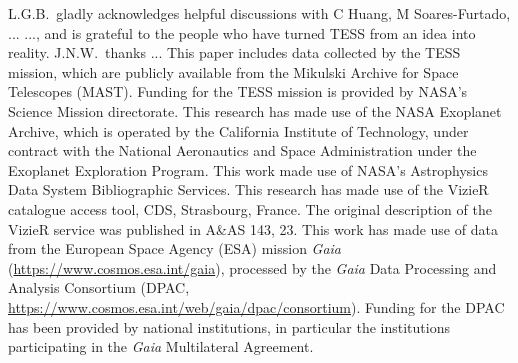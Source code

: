 \documentclass[12pt,twocolumn,tighten]{aastex62}
\begin{document}
\acknowledgements
L.G.B.\ gladly acknowledges helpful discussions with
C Huang, M Soares-Furtado, ...
..., and is
grateful to the people who have turned TESS from an idea into reality.
%
J.N.W.\ thanks ...
%
This paper includes data collected by the TESS mission, which are
publicly available from the Mikulski Archive for Space Telescopes
(MAST).
%
Funding for the TESS mission is provided by NASA's Science Mission
directorate.
%
This research has made use of the NASA Exoplanet Archive, which is
operated by the California Institute of Technology, under contract
with the National Aeronautics and Space Administration under the
Exoplanet Exploration Program.
%
This work made use of NASA's Astrophysics Data System Bibliographic
Services.
%
This research has made use of the VizieR catalogue access tool, CDS,
Strasbourg, France. The original description of the VizieR service was
published in A\&AS 143, 23.
%
This work has made use of data from the European Space Agency (ESA)
mission {\it Gaia} (\url{https://www.cosmos.esa.int/gaia}), processed
by the {\it Gaia} Data Processing and Analysis Consortium (DPAC,
\url{https://www.cosmos.esa.int/web/gaia/dpac/consortium}). Funding
for the DPAC has been provided by national institutions, in particular
the institutions participating in the {\it Gaia} Multilateral
Agreement.
%
\newline
%
%

                            
 
\end{document}
